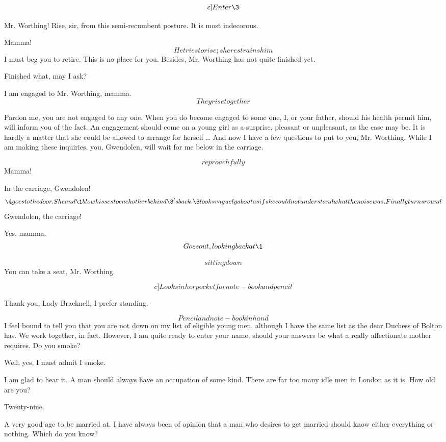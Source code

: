 \documentclass{book}
\begin{document}
\[c]Enter \3\]

\3  Mr. Worthing!  Rise, sir, from this semi-re\-cum\-bent
posture.  It is most indecorous.

\4  Mamma!  \[He tries to rise; she restrains him\]  I must
beg you to retire.  This is no place for you.  Besides, Mr.
Worthing has not quite finished yet.

\3  Finished what, may I ask?

\4  I am engaged to Mr. Worthing, mamma.  \[They rise
together\]

\3  Pardon me, you are not engaged to any one.  When
you do become engaged to some one, I, or your father, should his
health permit him, will inform you of the fact.  An engagement
should come on a young girl as a surprise, pleasant or unpleasant,
as the case may be.  It is hardly a matter that she could be
allowed to arrange for herself \ldots{} And now I have a few questions
to put to you, Mr. Worthing.  While I am making these inquiries,
you, Gwendolen, will wait for me below in the carriage.

\4  \[reproachfully\]  Mamma!

\3  In the carriage, Gwendolen!\[\4 goes to
the door.  She and \1 blow kisses to each other behind 
\3's back.  \3 looks vaguely about as if she
could not understand what the noise was.  Finally turns round\]
Gwendolen, the carriage!

\4  Yes, mamma.  \[Goes out, looking back at \1\]

\3  \[sitting down\]  You can take a seat, Mr.
Worthing.

\[c]Looks in her pocket for note-book and pencil\]

\1  Thank you, Lady Bracknell, I prefer standing.

\3  \[Pencil and note-book in hand\]  I feel bound to
tell you that you are not down on my list of eligible young men,
although I have the same list as the dear Duchess of Bolton has.
We work together, in fact.  However, I am quite ready to enter your
name, should your answers be what a really affectionate mother
requires.  Do you smoke?

\1  Well, yes, I must admit I smoke.

\3  I am glad to hear it.  A man should always have an
occupation of some kind.  There are far too many idle men in London
as it is.  How old are you?

\1  Twenty-nine.

\3  A very good age to be married at.  I have always
been of opinion that a man who desires to get married should know
either everything or nothing.  Which do you know?
\end{document}
